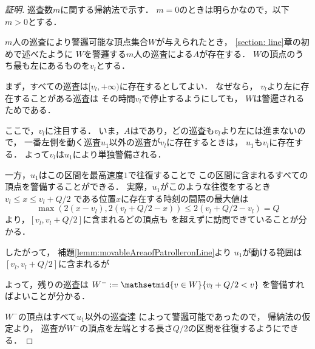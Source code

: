 \begin{proof}[証明]

	\newcommand{\leftmostpoint}{v_l}
	\newcommand{\leftmostpatroller}{u_1}

	巡査数$m$に関する帰納法で示す．
	$m = 0$のときは明らかなので，以下$m > 0$とする．

	$m$人の巡査により警邏可能な頂点集合$W$が与えられたとき，
	\ref{section: line}章の初めで述べたように
	$W$を警邏する$m$人の巡査による{\orderedrun}$A$が存在する．
	$W$の頂点のうち最も左にあるものを$\leftmostpoint$とする．

	まず，すべての巡査は$[\leftmostpoint, +\infty)$に存在するとしてよい．
	なぜなら，
	$\leftmostpoint$より左に存在することがある巡査は
	その時間$\leftmostpoint$で停止するようにしても，
	$W$は警邏されるためである．

	ここで，$\leftmostpoint$に注目する．
	いま，$A$は{\orderedrun}であり，どの巡査も$\leftmostpoint$より左には進まないので，
	一番左側を動く巡査$\leftmostpatroller$以外の巡査が$\leftmostpoint$に存在するときは，
	$\leftmostpatroller$も$\leftmostpoint$に存在する．
	よって$\leftmostpoint$は$\leftmostpatroller$により単独警備される．

	一方，$\leftmostpatroller$はこの区間を最高速度$1$で往復することで
	この区間に含まれるすべての頂点を警備することができる．
	実際，$\leftmostpatroller$がこのような往復をするとき
	$\leftmostpoint \leq x \leq \leftmostpoint + Q/2$
	である位置$x$に存在する時刻の間隔の最大値は
	\[
		\max( 2(x - \leftmostpoint), 2(\leftmostpoint + Q/2 - x) )
		\leq 2(\leftmostpoint + Q/2 - \leftmostpoint) = Q
	\]
	より，$[\leftmostpoint, \leftmostpoint + Q/2]$に含まれるどの頂点も
	{\timelimit}を超えずに訪問できていることが分かる．

	したがって，
	補題\ref{lemm:movableAreaofPatrolleronLine}より
	$\leftmostpatroller$が動ける範囲は
	$[\leftmostpoint, \leftmostpoint + Q/2]$に含まれるが
	
	よって，残りの巡査は
	$W ^- := \mathsetmid{ v \in W }{ \leftmostpoint + Q/2 < v }$
	を警備すればよいことが分かる．

	$W ^-$の頂点はすべて$\leftmostpatroller$以外の巡査達
	によって警邏可能であったので，
	帰納法の仮定より，
	巡査が$W ^-$の頂点を左端とする長さ$Q / 2$の区間を往復するようにできる．
\end{proof}

